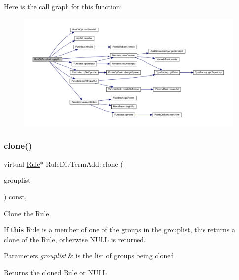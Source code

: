 Here is the call graph for this function\+:
\nopagebreak
\begin{figure}[H]
\begin{center}
\leavevmode
\includegraphics[width=350pt]{class_rule_div_term_add_ad39ae5dc8516af986340cd55e063afcc_cgraph}
\end{center}
\end{figure}
\mbox{\label{class_rule_div_term_add_a28bccfa9d7315e4e2493302bb18f4691}} 
\subsubsection{\texorpdfstring{clone()}{clone()}}
{\footnotesize\ttfamily virtual \mbox{\hyperlink{class_rule}{Rule}}$\ast$ Rule\+Div\+Term\+Add\+::clone (\begin{DoxyParamCaption}\item[{const \mbox{\hyperlink{class_action_group_list}{Action\+Group\+List}} \&}]{grouplist }\end{DoxyParamCaption}) const\hspace{0.3cm}{\ttfamily [inline]}, {\ttfamily [virtual]}}



Clone the \mbox{\hyperlink{class_rule}{Rule}}. 

If {\bfseries{this}} \mbox{\hyperlink{class_rule}{Rule}} is a member of one of the groups in the grouplist, this returns a clone of the \mbox{\hyperlink{class_rule}{Rule}}, otherwise N\+U\+LL is returned. 
\begin{DoxyParams}{Parameters}
{\em grouplist} & is the list of groups being cloned \\
\hline
\end{DoxyParams}
\begin{DoxyReturn}{Returns}
the cloned \mbox{\hyperlink{class_rule}{Rule}} or N\+U\+LL 
\end{DoxyReturn}


